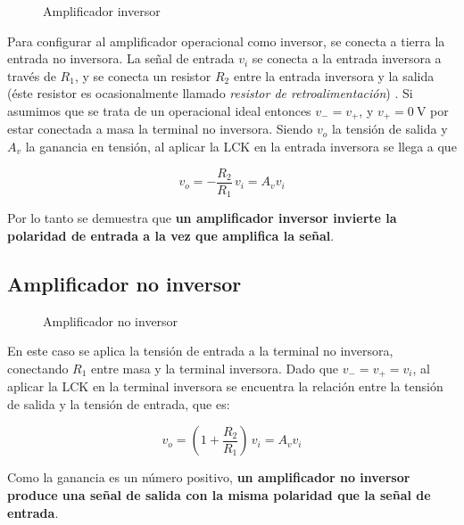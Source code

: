 \begin{wrapfigure}{r}{0.4\textwidth}
    \centering
    
    \caption{Amplificador inversor}
    \label{fig:intro:opamp-inversor}
\end{wrapfigure}


Para configurar al amplificador operacional como inversor, se conecta a tierra la entrada no inversora. La señal de entrada $v_i$ se conecta a la entrada inversora a través de $R_1$, y se conecta un resistor $R_2$ entre la entrada inversora y la salida (éste resistor es ocasionalmente llamado \textit{resistor de retroalimentación}) \cite[pág. 181]{FDCE}.
Si asumimos que se trata de un operacional ideal entonces $v_{-} = v_{+}$, y $v_{+} = \SI{0}{\volt}$ por estar conectada a masa la terminal no inversora. Siendo $v_o$ la tensión de salida y $A_v$ la ganancia en tensión, al aplicar la LCK en la entrada inversora se llega a que

\begin{equation}
    \label{ec:intro:opamp-inversor}
    v_o = - \frac{R_2}{R_1} \, v_i = A_v v_i
\end{equation}

Por lo tanto se demuestra que \textbf{un amplificador inversor invierte la polaridad de entrada a la vez que amplifica la señal}.

\subsection{Amplificador no inversor}
\label{sec:intro:opamp-noinversor}

\begin{wrapfigure}{r}{0.4\textwidth}
    \centering
    
    \caption{Amplificador no inversor}
    \label{fig:intro:opamp-no-inversor}
\end{wrapfigure}

En este caso se aplica la tensión de entrada a la terminal no inversora, conectando $R_1$ entre masa y la terminal inversora. Dado que $v_{-} = v_{+} = v_i$, al aplicar la LCK en la terminal inversora se encuentra la relación entre la tensión de salida y la tensión de entrada, que es:

\begin{equation}
    \label{ec:intro:opamp-noinversor}
    v_o = \left(1 + \frac{R_2}{R_1}\right) \, v_i = A_v v_i
\end{equation}

Como la ganancia es un número positivo, \textbf{un amplificador no inversor produce una señal de salida con la misma polaridad que la señal de entrada}.

